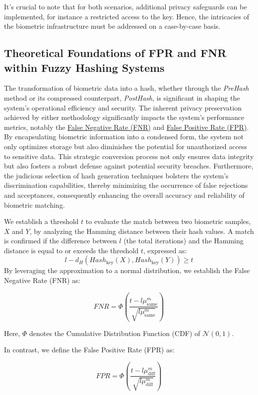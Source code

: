 It's crucial to note that for both scenarios, additional privacy safeguards can be implemented, for instance a restricted access to the key. Hence, the intricacies of the biometric infrastructure must be addressed on a case-by-case basis.

\subsection{Theoretical Foundations of FPR and FNR within Fuzzy Hashing Systems}

The transformation of biometric data into a hash, whether through the \textit{PreHash} method or its compressed counterpart, \textit{PostHash}, is significant in shaping the system's operational efficiency and security. The inherent privacy preservation achieved by either methodology significantly impacts the system's performance metrics, notably the \hyperref[def:FNR]{False Negative Rate (FNR)} and \hyperref[def:FPR]{False Positive Rate (FPR)}. By encapsulating biometric information into a condensed form, the system not only optimizes storage but also diminishes the potential for unauthorized access to sensitive data. This strategic conversion process not only ensures data integrity but also fosters a robust defense against potential security breaches. Furthermore, the judicious selection of hash generation techniques bolsters the system's discrimination capabilities, thereby minimizing the occurrence of false rejections and acceptances, consequently enhancing the overall accuracy and reliability of biometric matching.

We establish a threshold \(t\) to evaluate the match between two biometric samples, \(X\) and \(Y\), by analyzing the Hamming distance between their hash values. A match is confirmed if the difference between \(l\) (the total iterations) and the Hamming distance is equal to or exceeds the threshold \(t\), expressed as: \[l - d_H(Hash_{\text{key}}(X), Hash_{\text{key}}(Y)) \geq t\]
By leveraging the approximation to a normal distribution, we establish the False Negative Rate (FNR) as:

\[FNR = \Phi\left( \frac{t - l\mu_{\text{same}}^m}{\sqrt{l\mu_{\text{same}}^m}} \right)\]

Here, \(\Phi\) denotes the Cumulative Distribution Function (CDF) of \(\mathcal{N}(0, 1)\).

In contrast, we define the False Positive Rate (FPR) as:

\[FPR = \Phi\left( \frac{t - l\mu_{\text{diff}}^m}{\sqrt{l\mu_{\text{diff}}^m}} \right)\]

